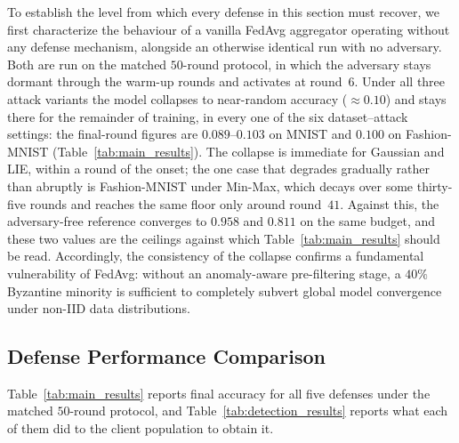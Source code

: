 \documentclass[journal]{IEEEtran}
\begin{document}
To establish the level from which every defense in this section must recover, we first characterize the behaviour of a vanilla FedAvg aggregator operating without any defense mechanism, alongside an otherwise identical run with no adversary. Both are run on the matched $50$-round protocol, in which the adversary stays dormant through the warm-up rounds and activates at round~$6$. Under all three attack variants the model collapses to near-random accuracy ($\approx 0.10$) and stays there for the remainder of training, in every one of the six dataset--attack settings: the final-round figures are $0.089$--$0.103$ on MNIST and $0.100$ on Fashion-MNIST (Table~\ref{tab:main_results}). The collapse is immediate for Gaussian and LIE, within a round of the onset; the one case that degrades gradually rather than abruptly is Fashion-MNIST under Min-Max, which decays over some thirty-five rounds and reaches the same floor only around round~$41$. Against this, the adversary-free reference converges to $0.958$ and $0.811$ on the same budget, and these two values are the ceilings against which Table~\ref{tab:main_results} should be read. Accordingly, the consistency of the collapse confirms a fundamental vulnerability of FedAvg: without an anomaly-aware pre-filtering stage, a $40\%$ Byzantine minority is sufficient to completely subvert global model convergence under non-IID data distributions.


\subsection{Defense Performance Comparison}
\label{sec:defense_comparison}

Table~\ref{tab:main_results} reports final accuracy for all five defenses under the matched $50$-round protocol, and Table~\ref{tab:detection_results} reports what each of them did to the client population to obtain it.
\end{document}

